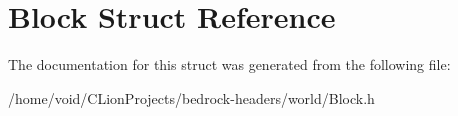 \hypertarget{struct_block}{}\section{Block Struct Reference}
\label{struct_block}


The documentation for this struct was generated from the following file\+:\begin{DoxyCompactItemize}
\item 
/home/void/\+C\+Lion\+Projects/bedrock-\/headers/world/Block.\+h\end{DoxyCompactItemize}
